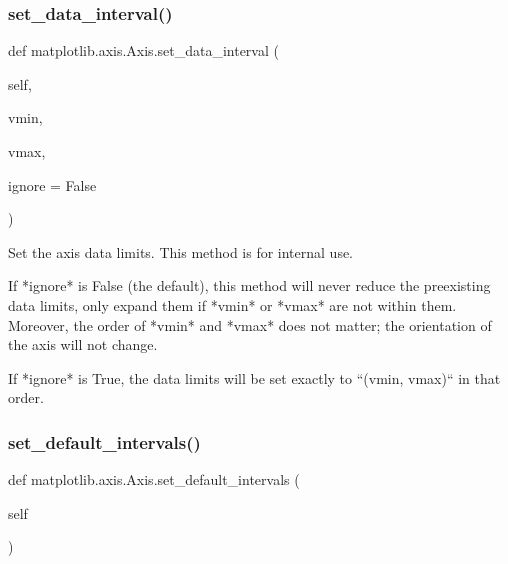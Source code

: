 \mbox{\label{classmatplotlib_1_1axis_1_1Axis_a8d64e783e8dab9a66528d084c5b86129}} 
\subsubsection{\texorpdfstring{set\+\_\+data\+\_\+interval()}{set\_data\_interval()}}
{\footnotesize\ttfamily def matplotlib.\+axis.\+Axis.\+set\+\_\+data\+\_\+interval (\begin{DoxyParamCaption}\item[{}]{self,  }\item[{}]{vmin,  }\item[{}]{vmax,  }\item[{}]{ignore = {\ttfamily False} }\end{DoxyParamCaption})}

\begin{DoxyVerb}Set the axis data limits.  This method is for internal use.

If *ignore* is False (the default), this method will never reduce the
preexisting data limits, only expand them if *vmin* or *vmax* are not
within them.  Moreover, the order of *vmin* and *vmax* does not matter;
the orientation of the axis will not change.

If *ignore* is True, the data limits will be set exactly to ``(vmin,
vmax)`` in that order.
\end{DoxyVerb}
 \mbox{\label{classmatplotlib_1_1axis_1_1Axis_aa438946ca6cd749ab253856c5193c490}} 
\subsubsection{\texorpdfstring{set\+\_\+default\+\_\+intervals()}{set\_default\_intervals()}}
{\footnotesize\ttfamily def matplotlib.\+axis.\+Axis.\+set\+\_\+default\+\_\+intervals (\begin{DoxyParamCaption}\item[{}]{self }\end{DoxyParamCaption})}

